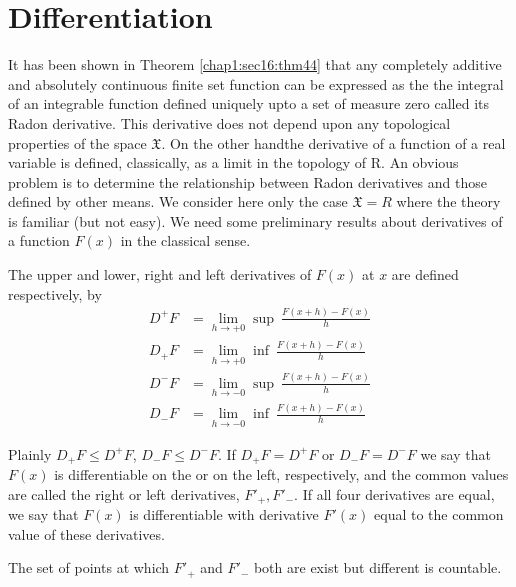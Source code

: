 \section{Differentiation}\label{chap1:sec18}

It has been shown in Theorem \ref{chap1:sec16:thm44} that any completely additive and
absolutely continuous finite set function can be expressed as the  
the integral of an integrable function defined uniquely upto a set of
measure zero called its Radon derivative. This derivative does not depend  
upon any topological properties of the space $\mathfrak{X}$. On the
other hand\pageoriginale the derivative of a function of a real variable is defined,  
classically, as a limit in the topology of R. An obvious problem is to
determine the relationship between Radon derivatives and those  
defined by other means. We consider here only the case $\mathfrak{X}=
R$  where the theory is familiar (but not easy). We need some  
preliminary results about derivatives of a function $F(x)$ in the
classical sense. 

\begin{defi*}
  The upper and lower, right and left
  derivatives of $F(x)$ at $x$ are defined respectively, by  
  \begin{align*}
    D ^+ F &= \lim\limits_{h \rightarrow + 0}\sup ~\frac{F(x+h)-F(x)}{h}\\
    D_+ F & = \lim\limits_{h \rightarrow + 0}\inf ~\frac{F(x+h)-F(x)}{h}\\
    D^- F & = \lim\limits_{h \rightarrow -0} \sup ~\frac{F(x+h)-F(x)}{h}\\
    D_- F & = \lim\limits_{h \rightarrow - 0} \inf ~\frac{F(x+h)-F(x)}{h}
  \end{align*}
\end{defi*}

Plainly $D_+ F \leq D^+F$, $D_-F \leq D^-F$. If $D_+F = D^+F$ or $D_-F = D^-F$ 
we say that $F(x)$ is differentiable on the or on the left,
respectively, and the common values are called the right or left 
derivatives, $F'_+ , F'_-$. If all four derivatives are equal, we say
that $F(x)$  is differentiable with derivative $F'(x)$ equal 
to the common value of these derivatives.

\begin{theorem}\label{chap1:sec18:thm48}
  The set of points at which $F'_+$ and $F'_- $ both are exist but different
  is countable. 
\end{theorem}

